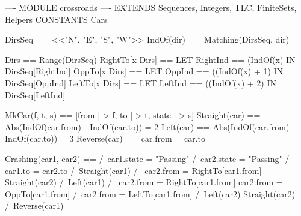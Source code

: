\documentclass[14pt, openany]{report}
\begin{document}
\begin{tla}
  ---- MODULE crossroads ----
EXTENDS Sequences, Integers, TLC, FiniteSets, Helpers
CONSTANTS Cars

DirsSeq == <<"N", "E", "S", "W">>
IndOf(dir) == Matching(DirsSeq, dir)

Dirs == Range(DirsSeq)
RightTo[x \in Dirs] == 
  LET RightInd == (IndOf(x) %
  IN DirsSeq[RightInd]
OppTo[x \in Dirs] ==
  LET OppInd == ((IndOf(x) + 1) %
  IN DirsSeq[OppInd]
LeftTo[x \in Dirs] == 
  LET LeftInd == ((IndOf(x) + 2) %
  IN DirsSeq[LeftInd] 

MkCar(f, t, s) == [from |-> f, to |-> t, state |-> s]
Straight(car) == Abs(IndOf(car.from) - IndOf(car.to)) = 2
Left(car) == Abs(IndOf(car.from) - IndOf(car.to)) = 3
Reverse(car) == car.from = car.to
  
Crashing(car1, car2) == 
  /\ car1.state = "Passing" 
  /\ car2.state = "Passing" 
  /\ \/ car1.to = car2.to  
     \/ /\ Straight(car1) 
        /\ \/ car2.from = RightTo[car1.from] 
           \/ Straight(car2)
     \/ /\ Left(car1)
        /\ \/ car2.from = RightTo[car1.from]
           \/ car2.from = OppTo[car1.from]
           \/ /\ car2.from = LeftTo[car1.from]
              /\ Left(car2) \/ Straight(car2)
     \/ /\ Reverse(car1)     
\end{tla}
\end{document}
